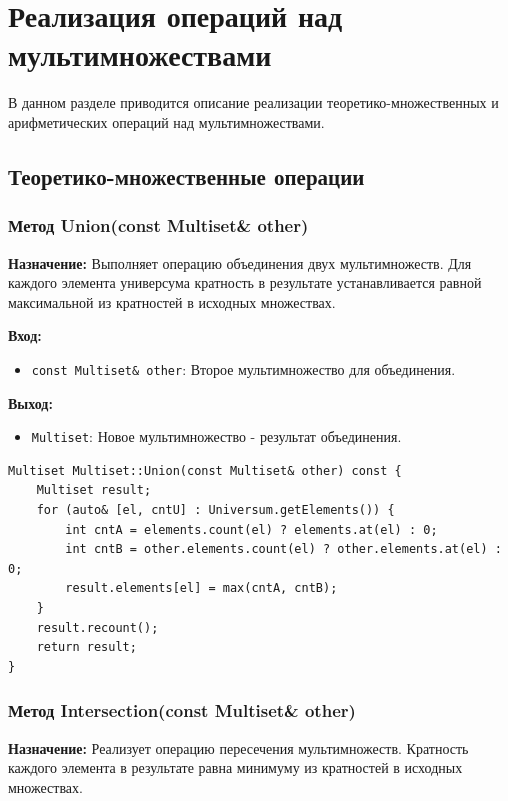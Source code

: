 \section{Реализация операций над мультимножествами}

В данном разделе приводится описание реализации теоретико-множественных и арифметических операций над мультимножествами.

\subsection{Теоретико-множественные операции}

\subsubsection{Метод Union(const Multiset\& other)}

\textbf{Назначение:} Выполняет операцию объединения двух мультимножеств. Для каждого элемента универсума кратность в результате устанавливается равной максимальной из кратностей в исходных множествах.

\textbf{Вход:}
\begin{itemize}
    \item \texttt{const Multiset\& other}: Второе мультимножество для объединения.
\end{itemize}

\textbf{Выход:}
\begin{itemize}
    \item \texttt{Multiset}: Новое мультимножество - результат объединения.
\end{itemize}

\begin{lstlisting}[style=cstyle, caption={Реализация Union()}]
Multiset Multiset::Union(const Multiset& other) const {
    Multiset result;
    for (auto& [el, cntU] : Universum.getElements()) {
        int cntA = elements.count(el) ? elements.at(el) : 0;
        int cntB = other.elements.count(el) ? other.elements.at(el) : 0;
        result.elements[el] = max(cntA, cntB);
    }
    result.recount();
    return result;
}
\end{lstlisting}

\subsubsection{Метод Intersection(const Multiset\& other)}

\textbf{Назначение:} Реализует операцию пересечения мультимножеств. Кратность каждого элемента в результате равна минимуму из кратностей в исходных множествах.

